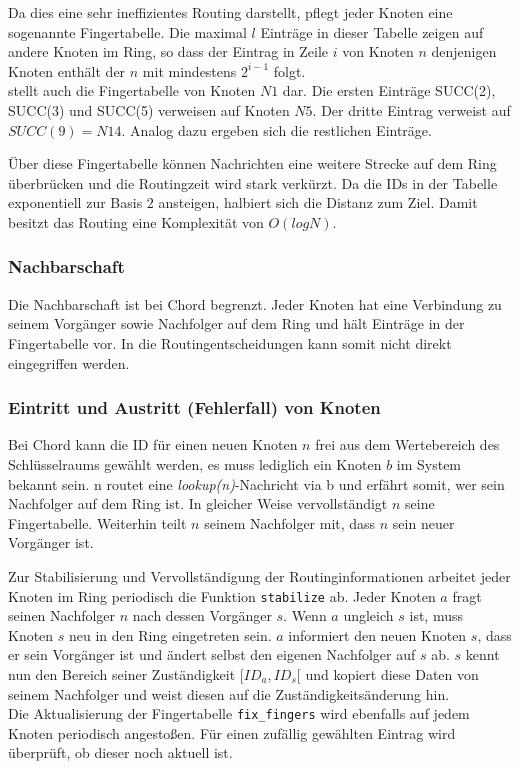 Da dies eine sehr ineffizientes  Routing darstellt, pflegt jeder Knoten eine sogenannte Fingertabelle. Die maximal $l$ Einträge in dieser Tabelle zeigen auf andere Knoten im Ring, so dass der Eintrag in Zeile $i$ von Knoten $n$ denjenigen Knoten enthält der $n$ mit mindestens $2^{i-1}$ folgt.\\
 stellt auch die Fingertabelle von Knoten $N1$ dar. Die ersten Einträge SUCC(2), SUCC(3) und SUCC(5) verweisen auf Knoten $N5$. Der dritte Eintrag verweist auf $SUCC(9) = N14$. Analog dazu ergeben sich die restlichen Einträge.

Über diese Fingertabelle können Nachrichten eine weitere Strecke auf dem Ring überbrücken und die Routingzeit wird stark verkürzt. Da die IDs in der Tabelle exponentiell zur Basis $2$ ansteigen, halbiert sich die Distanz zum Ziel. Damit besitzt das Routing eine Komplexität von $O(log N)$.

\subsubsection{Nachbarschaft}
Die Nachbarschaft ist bei Chord begrenzt. Jeder Knoten hat eine Verbindung zu seinem Vorgänger sowie Nachfolger auf dem Ring und hält Einträge in der Fingertabelle vor. In die Routingentscheidungen kann somit nicht direkt eingegriffen werden.

\subsubsection{Eintritt und Austritt (Fehlerfall) von Knoten}
Bei Chord kann die ID für einen neuen Knoten $n$ frei aus dem Wertebereich des Schlüsselraums gewählt werden, es muss lediglich ein Knoten $b$ im System bekannt sein. n routet eine \emph{lookup(n)}-Nachricht via b und erfährt somit, wer sein Nachfolger auf dem Ring ist. In gleicher Weise vervollständigt $n$ seine Fingertabelle. Weiterhin teilt $n$ seinem Nachfolger mit, dass $n$ sein neuer Vorgänger ist.

Zur Stabilisierung und Vervollständigung der Routinginformationen arbeitet jeder Knoten im Ring periodisch die Funktion \texttt{stabilize} ab. Jeder Knoten $a$ fragt seinen Nachfolger $n$ nach dessen Vorgänger $s$. Wenn $a$ ungleich $s$ ist, muss Knoten $s$ neu in den Ring eingetreten sein. $a$ informiert den neuen Knoten $s$, dass er sein Vorgänger ist und ändert selbst den eigenen Nachfolger auf $s$ ab. $s$ kennt nun den Bereich seiner Zuständigkeit $[ID_a, ID_s[$ und kopiert diese Daten von seinem Nachfolger und weist diesen auf die Zuständigkeitsänderung hin.\\
Die Aktualisierung der Fingertabelle \texttt{fix\_fingers} wird ebenfalls auf jedem Knoten periodisch angestoßen. Für einen zufällig gewählten Eintrag wird überprüft, ob dieser noch aktuell ist.

